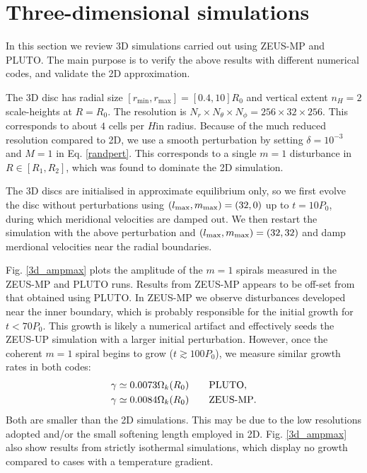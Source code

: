 \section{Three-dimensional simulations}\label{results3d}
In this section we review 3D simulations carried 
out using ZEUS-MP and PLUTO. The main purpose is to verify 
the above results with different numerical codes, and validate  
the 2D approximation.    

The 3D disc has radial size
$[r_\mathrm{min},r_\mathrm{max}]=[0.4,10]R_0$ and vertical extent  
$n_H=2$ scale-heights at $R=R_0$. The resolution is $N_r\times N_\theta\times
N_\phi=256\times32\times256$. This corresponds to about $4$ cells per
$H$in radius. Because of the much reduced resolution 
compared to 2D, we use a smooth perturbation by setting
$\delta = 10^{-3}$ and $M=1$ in Eq. \ref{randpert}. This corresponds
to a single $m=1$ disturbance in $R\in[R_1,R_2]$, which was found to dominate
the 2D simulation.  

The 3D discs are initialised in approximate equilibrium only, so we
first evolve the disc without perturbations using  
$(l_\mathrm{max},m_\mathrm{max})=(32,0)$ up to $t=10P_0$, during which 
meridional velocities are damped out. We then restart the simulation
with the above perturbation and $(l_\mathrm{max},m_\mathrm{max})=(32,32)$ and damp
merdional velocities near the radial boundaries. 

Fig. \ref{3d_ampmax} plots the amplitude of the $m=1$ spirals measured
in the ZEUS-MP and PLUTO runs. 
Results from ZEUS-MP appears to be off-set from that obtained using
PLUTO.  
In ZEUS-MP we observe disturbances developed near
the inner boundary, which is probably responsible for the initial growth
for $t<70P_0$. This growth is likely a numerical artifact and effectively seeds
the ZEUS-UP simulation with a larger initial perturbation.  However,
once the coherent $m=1$ spiral begins to grow ($t\gtrsim 100P_0$), 
we measure similar growth rates in both codes: 
\begin{align*}
  &\gamma \simeq 0.0073\Omega_k(R_0) \quad\quad \mathrm{PLUTO},\\
  &\gamma \simeq 0.0084\Omega_k(R_0) \quad\quad {\operatorname{ZEUS-MP}}.
\end{align*}
Both are smaller than the 2D simulations. This may be due to the
low resolutions adopted and/or the small softening length employed in
2D.  Fig. \ref{3d_ampmax} also show results from strictly isothermal
simulations, which display no growth compared to cases with a 
temperature gradient. 

